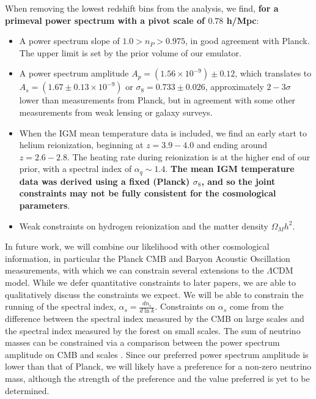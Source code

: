 When removing the lowest redshift bins from the analysis, we find, \textbf{for a primeval power spectrum with a pivot scale of $0.78$ h/Mpc}:
\begin{itemize}
    \item A power spectrum slope of $1.0 > n_P > 0.975$, in good agreement with Planck.
    The upper limit is set by the prior volume of our emulator.
    \item A power spectrum amplitude $A_p=\left(1.56\times10^{-9}\right) \pm 0.12$, which translates to $A_s=\left(1.67\pm0.13\times10^{-9}\right)$ or $\sigma_8 = 0.733 \pm 0.026$, approximately $2-3\sigma$ lower than measurements from Planck, but in agreement with some other measurements from weak lensing or galaxy surveys.
    \item When the IGM mean temperature data is included, we find an early start to helium reionization, beginning at $z = 3.9-4.0$ and ending around $z=2.6-2.8$.
    The heating rate during reionization is at the higher end of our prior, with a spectral index of $\alpha_q \sim 1.4$. \textbf{The mean IGM temperature data was derived using a fixed (Planck) $\sigma_8$, and so the joint constraints may not be fully consistent for the cosmological parameters}.
    \item Weak constraints on hydrogen reionization and the matter density $\Omega_M h^2$.
\end{itemize}

In future work, we will combine our \Lya likelihood with other cosmological information, in particular the Planck CMB and Baryon Acoustic Oscillation measurements, with which we can constrain several extensions to the $\Lambda$CDM model.
While we defer quantitative constraints to later papers, we are able to qualitatively discuss the constraints we expect.
We will be able to constrain the running of the spectral index, $\alpha_s = \frac{d n_s}{d \ln k}$.
Constraints on $\alpha_s$ come from the difference between the spectral index measured by the CMB on large scales and the spectral index measured by the \Lya forest on small scales.
The sum of neutrino masses can be constrained via a comparison between the power spectrum amplitude on CMB and \Lya scales \cite{2020JCAP...04..025P}.
Since our preferred power spectrum amplitude is lower than that of Planck, we will likely have a preference for a non-zero neutrino mass, although the strength of the preference and the value preferred is yet to be determined. 

